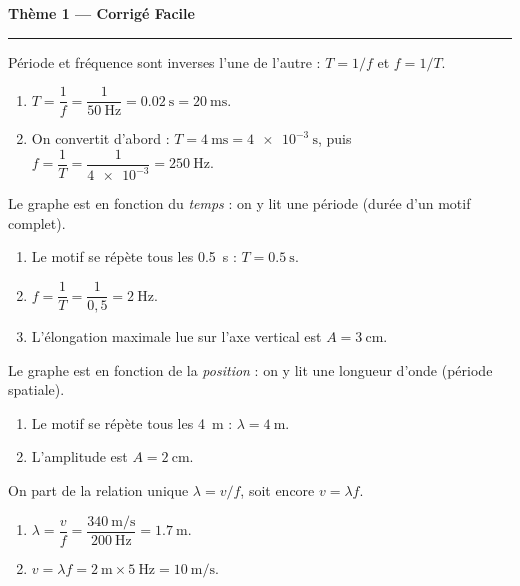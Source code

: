 \documentclass[11pt,a4paper]{article}
\begin{document}
\begin{center}
{\large\bfseries\color{excol} Thème 1 — Corrigé Facile}\\[-2pt]
{\color{excol}\rule{5cm}{1pt}}
\end{center}

\begin{corrige}
Période et fréquence sont inverses l'une de l'autre : $T=1/f$ et $f=1/T$.
\begin{enumerate}[label=\alph*)]
  \item $T=\dfrac{1}{f}=\dfrac{1}{\SI{50}{\hertz}}=\SI{0.02}{\second}=\SI{20}{\milli\second}.$
  \item On convertit d'abord : $T=\SI{4}{\milli\second}=\SI{4e-3}{\second}$, puis
        $f=\dfrac{1}{T}=\dfrac{1}{\num{4e-3}}=\SI{250}{\hertz}.$
\end{enumerate}
\end{corrige}

\begin{corrige}
Le graphe est en fonction du \emph{temps} : on y lit une période (durée d'un motif complet).
\begin{enumerate}[label=\alph*)]
  \item Le motif se répète tous les \SI{0.5}{\second} : $T=\SI{0.5}{\second}$.
  \item $f=\dfrac{1}{T}=\dfrac{1}{0{,}5}=\SI{2}{\hertz}.$
  \item L'élongation maximale lue sur l'axe vertical est $A=\SI{3}{\centi\metre}$.
\end{enumerate}
\end{corrige}

\begin{corrige}
Le graphe est en fonction de la \emph{position} : on y lit une longueur d'onde (période spatiale).
\begin{enumerate}[label=\alph*)]
  \item Le motif se répète tous les \SI{4}{\metre} : $\lambda=\SI{4}{\metre}.$
  \item L'amplitude est $A=\SI{2}{\centi\metre}$.
\end{enumerate}
\end{corrige}

\begin{corrige}
On part de la relation unique $\lambda=v/f$, soit encore $v=\lambda f$.
\begin{enumerate}[label=\alph*)]
  \item $\lambda=\dfrac{v}{f}=\dfrac{\SI{340}{\metre\per\second}}{\SI{200}{\hertz}}
        =\SI{1.7}{\metre}.$
  \item $v=\lambda f=\SI{2}{\metre}\times\SI{5}{\hertz}=\SI{10}{\metre\per\second}.$
\end{enumerate}
\end{corrige}
\end{document}
